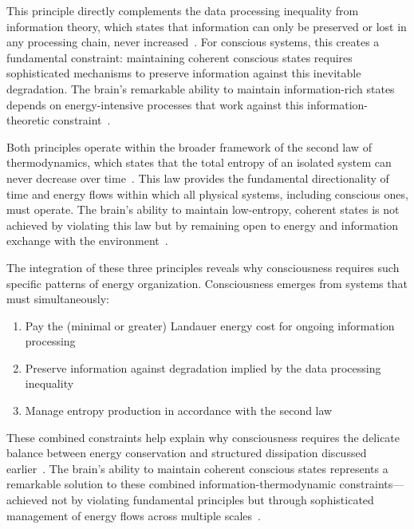 This principle directly complements the data processing inequality from information theory, which states that information can only be preserved or lost in any processing chain, never increased~. For conscious systems, this creates a fundamental constraint: maintaining coherent conscious states requires sophisticated mechanisms to preserve information against this inevitable degradation. The brain's remarkable ability to maintain information-rich states depends on energy-intensive processes that work against this information-theoretic constraint~\cite{laughlin2001}.

Both principles operate within the broader framework of the second law of thermodynamics, which states that the total entropy of an isolated system can never decrease over time~. This law provides the fundamental directionality of time and energy flows within which all physical systems, including conscious ones, must operate. The brain's ability to maintain low-entropy, coherent states is not achieved by violating this law but by remaining open to energy and information exchange with the environment~\cite{demetrius2015}.

The integration of these three principles reveals why consciousness requires such specific patterns of energy organization. Consciousness emerges from systems that must simultaneously:

\begin{enumerate}
    \item Pay the (minimal or greater) Landauer energy cost for ongoing information processing 
    \item Preserve information against degradation implied by the data processing inequality
    \item Manage entropy production in accordance with the second law
\end{enumerate}

These combined constraints help explain why consciousness requires the delicate balance between energy conservation and structured dissipation discussed earlier~. The brain's ability to maintain coherent conscious states represents a remarkable solution to these combined information-thermodynamic constraints—achieved not by violating fundamental principles but through sophisticated management of energy flows across multiple scales~.

